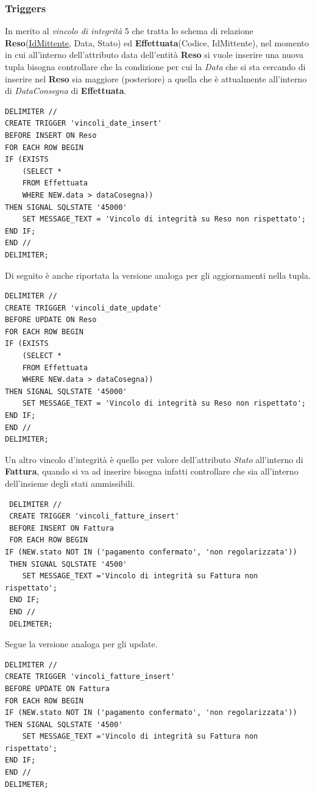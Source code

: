 \documentclass[a4paper,12pt]{article}
\begin{document}
\subsubsection{Triggers}
In merito al \textit{vincolo di integrità} 5 che tratta lo schema di relazione \textbf{Reso}(\underline{IdMittente}, Data, Stato) ed \textbf{Effettuata}(Codice, IdMittente), nel momento in cui all'interno dell'attributo data dell'entità \textbf{Reso} si vuole inserire una nuova tupla bisogna controllare che la condizione per cui la \textit{Data} che si sta cercando di inserire nel \textbf{Reso} sia maggiore (posteriore) a quella che è attualmente all'interno di \textit{DataConsegna }di \textbf{Effettuata}.
\begin{verbatim}
DELIMITER //
CREATE TRIGGER 'vincoli_date_insert'
BEFORE INSERT ON Reso
FOR EACH ROW BEGIN
IF (EXISTS 
	(SELECT *
	FROM Effettuata
	WHERE NEW.data > dataCosegna))
THEN SIGNAL SQLSTATE '45000'
	SET MESSAGE_TEXT = 'Vincolo di integrità su Reso non rispettato';
END IF;
END //
DELIMITER;
\end{verbatim}
Di seguito è anche riportata la versione analoga per gli aggiornamenti nella tupla.
\begin{verbatim}
DELIMITER //
CREATE TRIGGER 'vincoli_date_update' 
BEFORE UPDATE ON Reso
FOR EACH ROW BEGIN
IF (EXISTS 
	(SELECT *
	FROM Effettuata
	WHERE NEW.data > dataCosegna))
THEN SIGNAL SQLSTATE '45000'
	SET MESSAGE_TEXT = 'Vincolo di integrità su Reso non rispettato';
END IF;
END //
DELIMITER;
\end{verbatim}
 Un altro vincolo d'integrità è quello per valore dell'attributo \textit{Stato} all'interno di \textbf{Fattura}, quando si va ad inserire bisogna infatti controllare che sia all'interno dell'insieme degli stati ammissibili.
 \begin{verbatim}
 DELIMITER //
 CREATE TRIGGER 'vincoli_fatture_insert'
 BEFORE INSERT ON Fattura
 FOR EACH ROW BEGIN 
IF (NEW.stato NOT IN ('pagamento confermato', 'non regolarizzata'))
 THEN SIGNAL SQLSTATE '4500'
 	SET MESSAGE_TEXT ='Vincolo di integrità su Fattura non rispettato';
 END IF;
 END //
 DELIMETER;
 \end{verbatim}
Segue la versione analoga per gli update.
\begin{verbatim}
DELIMITER //
CREATE TRIGGER 'vincoli_fatture_insert'
BEFORE UPDATE ON Fattura
FOR EACH ROW BEGIN 
IF (NEW.stato NOT IN ('pagamento confermato', 'non regolarizzata'))
THEN SIGNAL SQLSTATE '4500'
	SET MESSAGE_TEXT ='Vincolo di integrità su Fattura non rispettato';
END IF;
END //
DELIMETER;
\end{verbatim}
\end{document}
